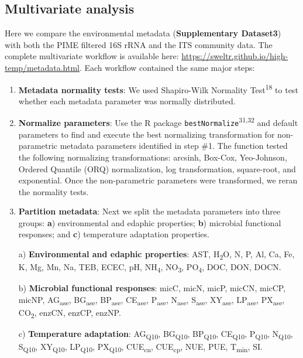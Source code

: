 \documentclass[
  10pt,
  letterpaper,
  DIV=11,
  numbers=noendperiod]{scrartcl}
\begin{document}
\hypertarget{multivariate-analysis}{%
\subsection{Multivariate analysis}\label{multivariate-analysis}}

Here we compare the environmental metadata (\textbf{Supplementary
Dataset3}) with both the PIME filtered 16S rRNA and the ITS community
data. The complete multivariate workflow is available here:
\url{https://sweltr.github.io/high-temp/metadata.html}. Each workflow
contained the same major steps:

\begin{enumerate}
\def\labelenumi{\arabic{enumi})}
\item
  \textbf{Metadata normality tests}: We used Shapiro-Wilk Normality
  Test\textsuperscript{18} to test whether each metadata parameter was
  normally distributed.
\item
  \textbf{Normalize parameters}: Use the R package
  \texttt{bestNormalize}\textsuperscript{31,32} and default parameters
  to find and execute the best normalizing transformation for
  non-parametric metadata parameters identified in step \#1. The
  function tested the following normalizing transformations: arcsinh,
  Box-Cox, Yeo-Johnson, Ordered Quantile (ORQ) normalization, log
  transformation, square-root, and exponential. Once the non-parametric
  parameters were transformed, we reran the normality tests.
\item
  \textbf{Partition metadata}: Next we split the metadata parameters
  into three groups: \textbf{a}) environmental and edaphic properties;
  \textbf{b}) microbial functional responses; and \textbf{c})
  temperature adaptation properties.

  \small a) \textbf{Environmental and edaphic properties}: AST,
  H\textsubscript{2}O, N, P, Al, Ca, Fe, K, Mg, Mn, Na, TEB, ECEC, pH,
  NH\textsubscript{4}, NO\textsubscript{3}, PO\textsubscript{4}, DOC,
  DON, DOCN.

  \small b) \textbf{Microbial functional responses}: micC, micN, micP,
  micCN, micCP, micNP, AG\textsubscript{ase}, BG\textsubscript{ase},
  BP\textsubscript{ase}, CE\textsubscript{ase}, P\textsubscript{ase},
  N\textsubscript{ase}, S\textsubscript{ase}, XY\textsubscript{ase},
  LP\textsubscript{ase}, PX\textsubscript{ase}, CO\textsubscript{2},
  enzCN, enzCP, enzNP.

  \small c) \textbf{Temperature adaptation}: AG\textsubscript{Q10},
  BG\textsubscript{Q10}, BP\textsubscript{Q10}, CE\textsubscript{Q10},
  P\textsubscript{Q10}, N\textsubscript{Q10}, S\textsubscript{Q10},
  XY\textsubscript{Q10}, LP\textsubscript{Q10}, PX\textsubscript{Q10},
  CUE\textsubscript{cn}, CUE\textsubscript{cp}, NUE, PUE,
  T\textsubscript{min}, SI.
\end{enumerate}
\end{document}
